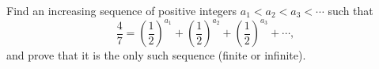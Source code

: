 Find an increasing sequence of positive integers $a_1<a_2<a_3<\cdots$ such that
\[
\dfrac{4}{7}=\left(\dfrac{1}{2}\right)^{a_1}+\left(\dfrac{1}{2}\right)^{a_2}+\left(\dfrac{1}{2}\right)^{a_3}+\cdots,
\]
and prove that it is the only such sequence (finite or infinite).
